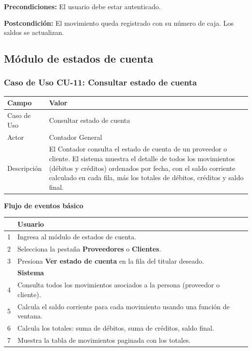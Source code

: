 \documentclass[stu]{apa7}
\begin{document}
\vspace{0.3cm}

\textbf{Precondiciones:} El usuario debe estar autenticado.

\textbf{Postcondición:} El movimiento queda registrado con su número de caja. Los saldos se actualizan.

\newpage

\subsection{Módulo de estados de cuenta}

\subsubsection{Caso de Uso CU-11: Consultar estado de cuenta}

\begin{tabularx}{\textwidth}{|l|X|}
\hline
\rowcolor[gray]{0.9}
\textbf{Campo} & \textbf{Valor} \\
\hline
Caso de Uso & Consultar estado de cuenta \\
\hline
Actor & Contador General \\
\hline
Descripción & El Contador consulta el estado de cuenta de un proveedor o cliente. El sistema muestra el detalle de todos los movimientos (débitos y créditos) ordenados por fecha, con el saldo corriente calculado en cada fila, más los totales de débitos, créditos y saldo final. \\
\hline
\end{tabularx}

\vspace{0.3cm}

\textbf{Flujo de eventos básico}

\begin{tabularx}{\textwidth}{|c|X|}
\hline
& \textbf{Usuario} \\
\hline
1 & Ingresa al módulo de estados de cuenta. \\
\hline
2 & Selecciona la pestaña \textbf{Proveedores} o \textbf{Clientes}. \\
\hline
3 & Presiona \textbf{Ver estado de cuenta} en la fila del titular deseado. \\
\hline
& \textbf{Sistema} \\
\hline
4 & Consulta todos los movimientos asociados a la persona (proveedor o cliente). \\
\hline
5 & Calcula el saldo corriente para cada movimiento usando una función de ventana. \\
\hline
6 & Calcula los totales: suma de débitos, suma de créditos, saldo final. \\
\hline
7 & Muestra la tabla de movimientos paginada con los totales. \\
\hline
\end{tabularx}
\end{document}
